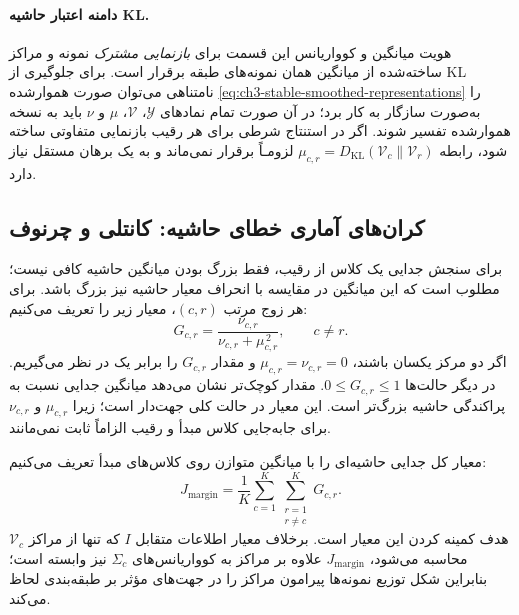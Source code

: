 \paragraph{دامنه اعتبار حاشیه KL.}
هویت میانگین و کوواریانس این قسمت
برای \emph{بازنمایی مشترک} نمونه
و مراکز ساخته‌شده از میانگین
همان نمونه‌های طبقه برقرار است.
برای جلوگیری از KL نامتناهی
می‌توان صورت هموارشده
\eqref{eq:ch3-stable-smoothed-representations}
را به‌صورت سازگار به کار برد؛
در آن صورت تمام نمادهای $\mathscr Y$،
$\mathcal V$، $\mu$ و $\nu$ باید
به نسخه هموارشده تفسیر شوند.
اگر در استنتاج شرطی برای هر رقیب
بازنمایی متفاوتی ساخته شود،
رابطه $\mu_{c,r}
=D_{\mathrm{KL}}(\mathcal V_c\|\mathcal V_r)$
لزومـاً برقرار نمی‌ماند
و به یک برهان مستقل نیاز دارد.



\subsection{کران‌های آماری خطای حاشیه: کانتلی و چرنوف}
\label{subsec:ch3-margin-criterion}
برای سنجش جدایی یک کلاس از رقیب، فقط بزرگ بودن میانگین حاشیه کافی نیست؛ مطلوب است که این میانگین در مقایسه با انحراف معیار حاشیه نیز بزرگ باشد. برای هر زوج مرتب $(c,r)$، معیار زیر را تعریف می‌کنیم:
\begin{equation}\label{eq:ch3-margin-pairwise}
\boxed{
G_{c,r}=\frac{\nu_{c,r}}{\nu_{c,r}+\mu_{c,r}^{\,2}},
\qquad c\ne r.}
\end{equation}
اگر دو مرکز یکسان باشند، $\mu_{c,r}=\nu_{c,r}=0$ و مقدار $G_{c,r}$ را برابر یک در نظر می‌گیریم. در دیگر حالت‌ها $0\le G_{c,r}\le1$. مقدار کوچک‌تر نشان می‌دهد میانگین جدایی نسبت به پراکندگی حاشیه بزرگ‌تر است. این معیار در حالت کلی جهت‌دار است؛ زیرا $\mu_{c,r}$ و $\nu_{c,r}$ برای جابه‌جایی کلاس مبدأ و رقیب الزاماً ثابت نمی‌مانند.

معیار کل جدایی حاشیه‌ای را با میانگین متوازن روی کلاس‌های مبدأ تعریف می‌کنیم:
\begin{equation}\label{eq:ch3-margin-criterion}
\boxed{
J_{\mathrm{margin}}
=\frac1K\sum_{c=1}^{K}\sum_{\substack{r=1\\r\ne c}}^{K}
G_{c,r}.}
\end{equation}
هدف کمینه کردن این معیار است. برخلاف معیار اطلاعات متقابل $I$ که تنها از مراکز $\mathcal V_c$ محاسبه می‌شود، $J_{\mathrm{margin}}$ علاوه بر مراکز به کوواریانس‌های $\Sigma_c$ نیز وابسته است؛ بنابراین شکل توزیع نمونه‌ها پیرامون مراکز را در جهت‌های مؤثر بر طبقه‌بندی لحاظ می‌کند.

